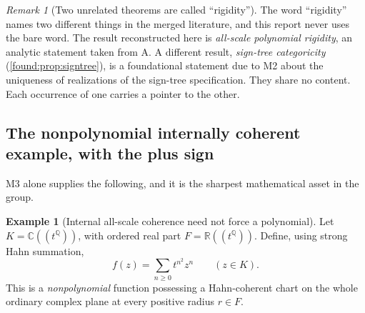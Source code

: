 \documentclass[11pt,letterpaper]{article}
\numberwithin{equation}{section}
\theoremstyle{definition}
\newtheorem{example}[theorem]{Example}
\theoremstyle{remark}
\newtheorem{remark}[theorem]{Remark}
\newcommand{\R}{\mathbb R}
\newcommand{\C}{\mathbb C}
\newcommand{\Q}{\mathbb Q}
\begin{document}
\begin{remark}[Two unrelated theorems are called ``rigidity''] \label{found:rem:rigidity}
The word ``rigidity'' names two different things in the merged literature, and
this report never uses the bare word. The result reconstructed here is
\emph{all-scale polynomial rigidity}, an analytic statement taken from A. A
different result, \emph{sign-tree categoricity}
(\cref{found:prop:signtree}), is a foundational statement due to M2 about the
uniqueness of realizations of the sign-tree specification. They share no
content. Each occurrence of one carries a pointer to the other.
\end{remark}

\subsection{The nonpolynomial internally coherent example, with the plus sign}
\label{found:sub:internal}
M3 alone supplies the following, and it is the sharpest mathematical asset in
the group.

\begin{example}[Internal all-scale coherence need not force a polynomial]\label{found:ex:internal}
Let $K=\C((t^\Q))$, with ordered real part $F=\R((t^\Q))$. Define, using strong
Hahn summation,
\begin{equation}\label{found:eq:nonpoly}
 f(z)=\sum_{n\ge0}t^{n^2}z^n\qquad(z\in K).
\end{equation}
This is a \emph{nonpolynomial} function possessing a Hahn-coherent chart on the
whole ordinary complex plane at every positive radius $r\in F$.
\end{example}
\end{document}
